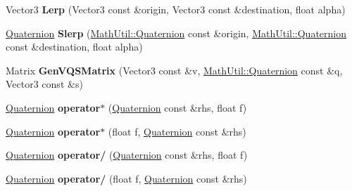 \begin{DoxyCompactItemize}
\item 
\mbox{\label{namespaceMathUtil_a4220678ebc92311d8425d3e3cf810395}} 
Vector3 {\bfseries Lerp} (Vector3 const \&origin, Vector3 const \&destination, float alpha)
\item 
\mbox{\label{namespaceMathUtil_a9a30d05c4b375601bc4d0ef27e11a24e}} 
\hyperlink{structMathUtil_1_1Quaternion}{Quaternion} {\bfseries Slerp} (\hyperlink{structMathUtil_1_1Quaternion}{Math\+Util\+::\+Quaternion} const \&origin, \hyperlink{structMathUtil_1_1Quaternion}{Math\+Util\+::\+Quaternion} const \&destination, float alpha)
\item 
\mbox{\label{namespaceMathUtil_a2c4a89f7c2c21d947eea7fd055c4dd51}} 
Matrix {\bfseries Gen\+V\+Q\+S\+Matrix} (Vector3 const \&v, \hyperlink{structMathUtil_1_1Quaternion}{Math\+Util\+::\+Quaternion} const \&q, Vector3 const \&s)
\item 
\mbox{\label{namespaceMathUtil_a1234b5a0ee62ff87185262dc6145329a}} 
\hyperlink{structMathUtil_1_1Quaternion}{Quaternion} {\bfseries operator$\ast$} (\hyperlink{structMathUtil_1_1Quaternion}{Quaternion} const \&rhs, float f)
\item 
\mbox{\label{namespaceMathUtil_aaee8f1e4099944bff98c5f4232fe8def}} 
\hyperlink{structMathUtil_1_1Quaternion}{Quaternion} {\bfseries operator$\ast$} (float f, \hyperlink{structMathUtil_1_1Quaternion}{Quaternion} const \&rhs)
\item 
\mbox{\label{namespaceMathUtil_a2cdfdf977e158316d59ffc5d80996842}} 
\hyperlink{structMathUtil_1_1Quaternion}{Quaternion} {\bfseries operator/} (\hyperlink{structMathUtil_1_1Quaternion}{Quaternion} const \&rhs, float f)
\item 
\mbox{\label{namespaceMathUtil_a713f41b345f7bd17833669d4b75bdb81}} 
\hyperlink{structMathUtil_1_1Quaternion}{Quaternion} {\bfseries operator/} (float f, \hyperlink{structMathUtil_1_1Quaternion}{Quaternion} const \&rhs)
\item 
\mbox{\label{namespaceMathUtil_a497f6c0ebc45c602ef213c5bcc5c2585}} 

\end{DoxyCompactItemize}
